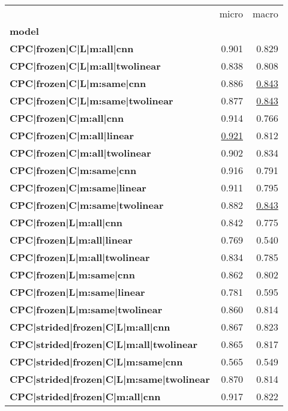 \begin{adjustbox}{width=\textwidth}
\begin{tabular}{lrr}
\toprule
{} &  micro &  macro \\
\textbf{model                                               } &        &        \\
\midrule
\textbf{CPC|frozen|C|L|m:all|cnn               } &  0.901 &  0.829 \\
\textbf{CPC|frozen|C|L|m:all|twolinear         } &  0.838 &  0.808 \\
\textbf{CPC|frozen|C|L|m:same|cnn              } &  0.886 &  \underline{0.843} \\
\textbf{CPC|frozen|C|L|m:same|twolinear        } &  0.877 &  \underline{0.843} \\
\textbf{CPC|frozen|C|m:all|cnn                 } &  0.914 &  0.766 \\
\textbf{CPC|frozen|C|m:all|linear            } &  \underline{0.921} &  0.812 \\
\textbf{CPC|frozen|C|m:all|twolinear           } &  0.902 &  0.834 \\
\textbf{CPC|frozen|C|m:same|cnn                } &  0.916 &  0.791 \\
\textbf{CPC|frozen|C|m:same|linear           } &  0.911 &  0.795 \\
\textbf{CPC|frozen|C|m:same|twolinear          } &  0.882 &  \underline{0.843} \\
\textbf{CPC|frozen|L|m:all|cnn                 } &  0.842 &  0.775 \\
\textbf{CPC|frozen|L|m:all|linear            } &  0.769 &  0.540 \\
\textbf{CPC|frozen|L|m:all|twolinear           } &  0.834 &  0.785 \\
\textbf{CPC|frozen|L|m:same|cnn                } &  0.862 &  0.802 \\
\textbf{CPC|frozen|L|m:same|linear           } &  0.781 &  0.595 \\
\textbf{CPC|frozen|L|m:same|twolinear          } &  0.860 &  0.814 \\
\textbf{CPC|strided|frozen|C|L|m:all|cnn       } &  0.867 &  0.823 \\
\textbf{CPC|strided|frozen|C|L|m:all|twolinear } &  0.865 &  0.817 \\
\textbf{CPC|strided|frozen|C|L|m:same|cnn      } &  0.565 &  0.549 \\
\textbf{CPC|strided|frozen|C|L|m:same|twolinear} &  0.870 &  0.814 \\
\textbf{CPC|strided|frozen|C|m:all|cnn         } &  0.917 &  0.822 \\

\end{tabular}
\end{adjustbox}
